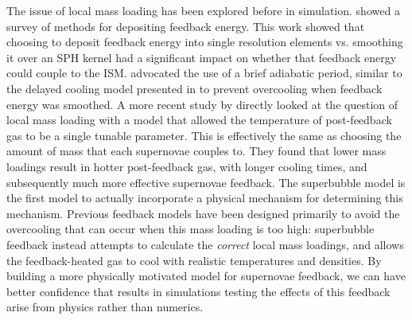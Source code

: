 The issue of local mass loading has been explored before in simulation.
\citet{Thacker2000} showed a survey of methods for depositing feedback energy.
This work showed that choosing to deposit feedback energy into single resolution
elements vs. smoothing it over an SPH kernel had a significant impact on whether
that feedback energy could couple to the ISM.  \citet{Thacker2000} advocated the
use of a brief adiabatic period, similar to the delayed cooling model presented
in \citet{Rosdahl2016} to prevent overcooling when feedback energy was smoothed.
A more recent study by \citet{DallaVecchia2012} directly looked at the question
of local mass loading with a model that allowed the temperature of post-feedback
gas to be a single tunable parameter.  This is effectively the same as choosing
the amount of mass that each supernovae couples to.  They found that lower mass
loadings result in hotter post-feedback gas, with longer cooling times, and
subsequently much more effective supernovae feedback.  The \citet{Keller2014}
superbubble model is the first model to actually incorporate a physical
mechanism for determining this mechanism.  Previous feedback models have been
designed primarily to avoid the overcooling that can occur when this mass
loading is too high: superbubble feedback instead attempts to calculate the {\it
correct} local mass loadings, and allows the feedback-heated gas to cool with
realistic temperatures and densities.  By building a more physically motivated
model for supernovae feedback, we can have better confidence that results in
simulations testing the effects of this feedback arise from physics rather than
numerics.

